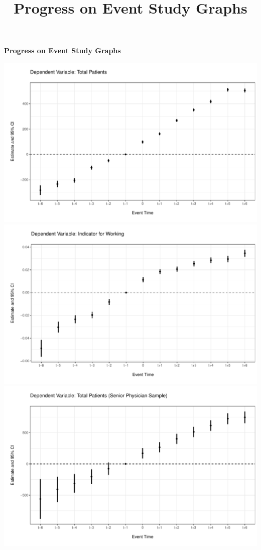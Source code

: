 \documentclass[11pt]{article}
\title{Progress on Event Study Graphs}
\begin{document}
\textbf{Progress on Event Study Graphs}

\vspace{2cm}

\centering

\includegraphics[scale=.7]{Objects/cont_ES_fullsample.pdf}
\includegraphics[scale=.7]{Objects/ind_ES_fullsample.pdf}
\includegraphics[scale=.7]{Objects/cont_ES_oldsample.pdf}
\end{document}
